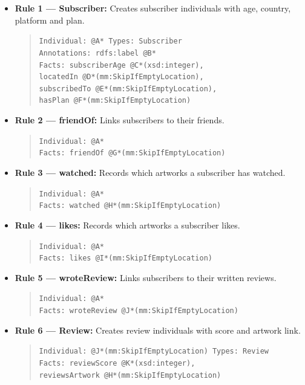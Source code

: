 \begin{itemize}
    \item \textbf{Rule 1 — Subscriber:} Creates subscriber individuals with age, country, platform and plan.
    \begin{quote}\small
    \texttt{Individual: @A* \quad Types: Subscriber}\\
    \texttt{Annotations: rdfs:label @B*}\\
    \texttt{Facts: subscriberAge @C*(xsd:integer),}\\
    \texttt{\phantom{Facts: }locatedIn @D*(mm:SkipIfEmptyLocation),}\\
    \texttt{\phantom{Facts: }subscribedTo @E*(mm:SkipIfEmptyLocation),}\\
    \texttt{\phantom{Facts: }hasPlan @F*(mm:SkipIfEmptyLocation)}
    \end{quote}

    \item \textbf{Rule 2 — friendOf:} Links subscribers to their friends.
    \begin{quote}\small
    \texttt{Individual: @A*}\\
    \texttt{Facts: friendOf @G*(mm:SkipIfEmptyLocation)}
    \end{quote}

    \item \textbf{Rule 3 — watched:} Records which artworks a subscriber has watched.
    \begin{quote}\small
    \texttt{Individual: @A*}\\
    \texttt{Facts: watched @H*(mm:SkipIfEmptyLocation)}
    \end{quote}

    \item \textbf{Rule 4 — likes:} Records which artworks a subscriber likes.
    \begin{quote}\small
    \texttt{Individual: @A*}\\
    \texttt{Facts: likes @I*(mm:SkipIfEmptyLocation)}
    \end{quote}

    \item \textbf{Rule 5 — wroteReview:} Links subscribers to their written reviews.
    \begin{quote}\small
    \texttt{Individual: @A*}\\
    \texttt{Facts: wroteReview @J*(mm:SkipIfEmptyLocation)}
    \end{quote}

    \item \textbf{Rule 6 — Review:} Creates review individuals with score and artwork link.
    \begin{quote}\small
    \texttt{Individual: @J*(mm:SkipIfEmptyLocation) \quad Types: Review}\\
    \texttt{Facts: reviewScore @K*(xsd:integer),}\\
    \texttt{\phantom{Facts: }reviewsArtwork @H*(mm:SkipIfEmptyLocation)}
    \end{quote}
\end{itemize}

